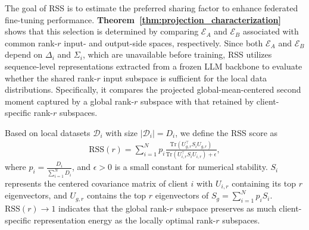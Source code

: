\documentclass[lettersize,journal]{IEEEtran}
\begin{document}
	
	
	
	The goal of RSS is to estimate the preferred sharing factor to enhance federated fine-tuning performance. \textbf{Theorem~\ref{thm:projection_characterization}} shows that this selection is determined by comparing $\mathcal{E}_A$ and $\mathcal{E}_B$ associated with common rank-$r$ input- and output-side spaces, respectively. Since both $\mathcal{E}_A$ and $\mathcal{E}_B$ depend on $\Delta_i$ and $\Sigma_i$, which are unavailable before training, RSS utilizes sequence-level representations extracted from a frozen LLM backbone to evaluate whether the shared rank-$r$ input subspace is sufficient for the local data distributions. Specifically, it compares {\color{black} the projected global-mean-centered second moment} captured by a global rank-$r$ subspace with that retained by client-specific rank-$r$ subspaces.
	
	Based on local datasets $\mathcal{D}_i$ with size $|\mathcal{D}_i|=D_i$, we define the RSS score as 
	\begin{align}\label{eq:rss}
		\mathrm{RSS}(r)
		=
		\sum_{i=1}^{N}
		p_i
		\frac{
			\mathrm{Tr}
			\left(
			U_{g,r}^{\top}S_iU_{g,r}
			\right)
		}{
			\mathrm{Tr}
			\left(
			U_{i,r}^{\top}S_iU_{i,r}
			\right)
			+
			\epsilon
		},
	\end{align}
	where $p_i = \frac{D_i}{\sum_{i=1}^N D_i}$, and $\epsilon>0$ is a small constant for numerical
	stability. 
	$S_i$ represents the centered covariance matrix of client $i$ with $U_{i,r}$ containing its top $r$ eigenvectors, and $U_{g,r}$ contains the top $r$
	eigenvectors of $S_g=\sum_{i=1}^{N}p_iS_i$. 
	$\mathrm{RSS}(r) \to 1$ indicates that the global rank-$r$ subspace preserves as much client-specific representation energy as the locally optimal rank-$r$ subspaces. 
	
\end{document}
